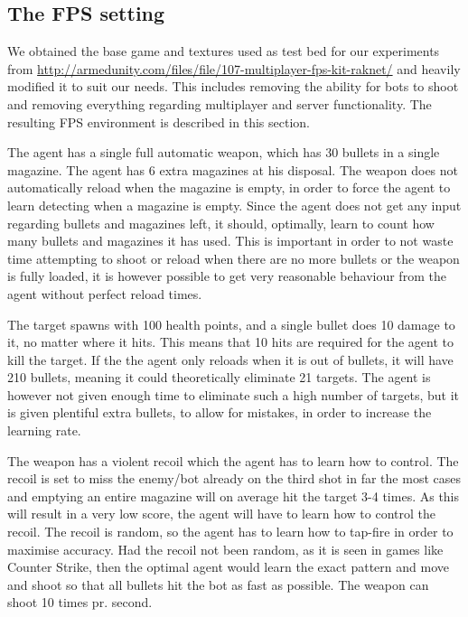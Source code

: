 \subsection{The FPS setting}
\label{sec:fpssetting}
We obtained the base game and textures used as test bed for our experiments from \url{http://armedunity.com/files/file/107-multiplayer-fps-kit-raknet/} and heavily modified it to suit our needs. This includes removing the ability for bots to shoot and removing everything regarding multiplayer and server functionality. The resulting FPS environment is described in this section.

The agent has a single full automatic weapon, which has 30 bullets in a single magazine. The agent has 6 extra magazines at his disposal. The weapon does not automatically reload when the magazine is empty, in order to force the agent to learn detecting when a magazine is empty. Since the agent does not get any input regarding bullets and magazines left, it should, optimally, learn to count how many bullets and magazines it has used. This is important in order to not waste time attempting to shoot or reload when there are no more bullets or the weapon is fully loaded, it is however possible to get very reasonable behaviour from the agent without perfect reload times.

The target spawns with 100 health points, and a single bullet does 10 damage to it, no matter where it hits. This means that 10 hits are required for the agent to kill the target. If the the agent only reloads when it is out of bullets, it will have 210 bullets, meaning it could theoretically eliminate 21 targets. The agent is however not given enough time to eliminate such a high number of targets, but it is given plentiful extra bullets, to allow for mistakes, in order to increase the learning rate.

The weapon has a violent recoil which the agent has to learn how to control. The recoil is set to miss the enemy/bot already on the third shot in far the most cases and emptying an entire magazine will on average hit the target 3-4 times. As this will result in a very low score, the agent will have to learn how to control the recoil. The recoil is random, so the agent has to learn how to tap-fire in order to maximise accuracy. Had the recoil not been random, as it is seen in games like Counter Strike, then the optimal agent would learn the exact pattern and move and shoot so that all bullets hit the bot as fast as possible. The weapon can shoot 10 times pr. second.

